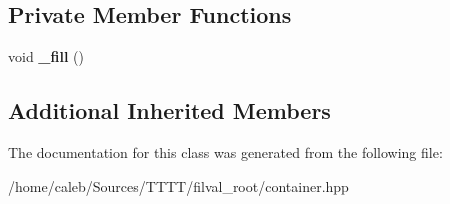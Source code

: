 \subsection*{Private Member Functions}
\begin{DoxyCompactItemize}
\item 
\hypertarget{classfilval_1_1root_1_1ContainerTH2_a657468cc202fe982e2c69f82003d64cc}{}\label{classfilval_1_1root_1_1ContainerTH2_a657468cc202fe982e2c69f82003d64cc} 
void {\bfseries \+\_\+fill} ()
\end{DoxyCompactItemize}
\subsection*{Additional Inherited Members}


The documentation for this class was generated from the following file\+:\begin{DoxyCompactItemize}
\item 
/home/caleb/\+Sources/\+T\+T\+T\+T/filval\+\_\+root/container.\+hpp\end{DoxyCompactItemize}

